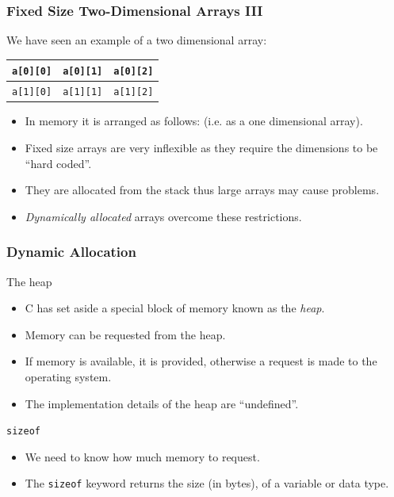 \documentclass[table]{beamer}
\newif\ifschigh\schighfalse
\newcommand{\kw}[1]{\ifschigh\textcolor{red}{#1}\else\textcolor{keyword}{#1}\fi}
\begin{document}
\begin{frame}
\frametitle{Fixed Size Two-Dimensional Arrays III}
We have seen an example of a two dimensional array:
\begin{center}
\begin{tabular}{|c|c|c|}
\hline
\tt a[0][0]&\tt a[0][1]&\tt a[0][2]\\
\hline
\tt a[1][0]&\tt a[1][1]&\tt a[1][2]\\
\hline
\end{tabular}
\end{center}
\begin{itemize}
\item In memory it is arranged as follows:
(i.e. as a one dimensional array).
\item Fixed size arrays are very inflexible as they require the dimensions to be ``hard coded''.
\item They are allocated from the stack thus large arrays may cause problems.
\item \emph{Dynamically allocated} arrays overcome these restrictions.
\end{itemize}
\end{frame}

\begin{frame}
\frametitle{Dynamic Allocation}
\begin{block}{The heap}
\begin{itemize}
\item C has set aside a special block of memory known as the \emph{heap}.
\item Memory can be requested from the heap.
\item If memory is available, it is provided, otherwise a request is made to the operating system.
\item The implementation details of the heap are ``undefined''.
\end{itemize}
\end{block}
\begin{block}{\tt sizeof}
\begin{itemize}
\item We need to know how much memory to request.
\item The \kw{\tt sizeof} keyword returns the size (in bytes), of a variable or data type.
\end{itemize}
\end{block}
\end{frame}
\end{document}
